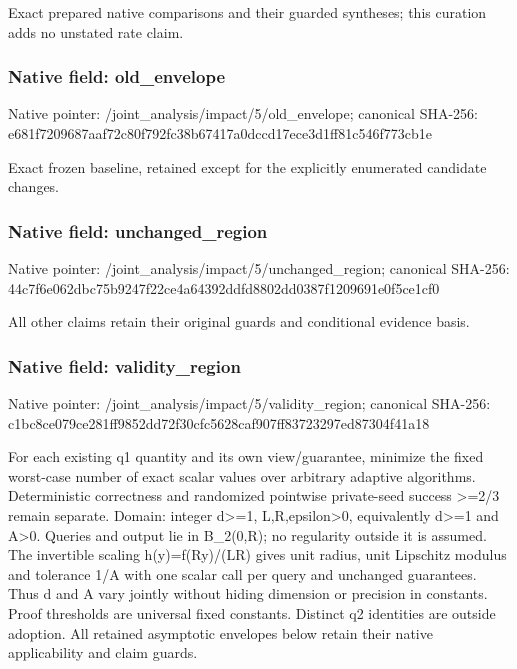 \documentclass[10pt,a4paper]{article}
\begin{document}
\begingroup\raggedright\sloppy Exact prepared native comparisons and their guarded syntheses;\allowbreak{} this curation adds no unstated rate claim.\par\endgroup

\subsubsection{Native field: old\_\allowbreak{}envelope}
Native pointer: /joint\_\allowbreak{}analysis/impact/5/old\_\allowbreak{}envelope; canonical SHA-256: e681f7209687aaf72c80f792fc38b67417a0dccd17ece3d1ff81c546f773cb1e

\begingroup\raggedright\sloppy Exact frozen baseline,\allowbreak{} retained except for the explicitly enumerated candidate changes.\par\endgroup

\subsubsection{Native field: unchanged\_\allowbreak{}region}
Native pointer: /joint\_\allowbreak{}analysis/impact/5/unchanged\_\allowbreak{}region; canonical SHA-256: 44c7f6e062dbc75b9247f22ce4a64392ddfd8802dd0387f1209691e0f5ce1cf0

\begingroup\raggedright\sloppy All other claims retain their original guards and conditional evidence basis.\par\endgroup

\subsubsection{Native field: validity\_\allowbreak{}region}
Native pointer: /joint\_\allowbreak{}analysis/impact/5/validity\_\allowbreak{}region; canonical SHA-256: c1bc8ce079ce281ff9852dd72f30cfc5628caf907ff83723297ed87304f41a18

\begingroup\raggedright\sloppy For each existing q1 quantity and its own view/\allowbreak{}guarantee,\allowbreak{} minimize the fixed worst-case number of exact scalar values over arbitrary adaptive algorithms. Deterministic correctness and randomized pointwise private-seed success >=\allowbreak{}2/\allowbreak{}3 remain separate. Domain:\allowbreak{} integer d>=\allowbreak{}1,\allowbreak{} L,\allowbreak{}R,\allowbreak{}epsilon>0,\allowbreak{} equivalently d>=\allowbreak{}1 and A>0. Queries and output lie in B\_\allowbreak{}2(0,\allowbreak{}R);\allowbreak{} no regularity outside it is assumed. The invertible scaling h(y)=\allowbreak{}f(Ry)/\allowbreak{}(LR) gives unit radius,\allowbreak{} unit Lipschitz modulus and tolerance 1/\allowbreak{}A with one scalar call per query and unchanged guarantees. Thus d and A vary jointly without hiding dimension or precision in constants. Proof thresholds are universal fixed constants. Distinct q2 identities are outside adoption. All retained asymptotic envelopes below retain their native applicability and claim guards.\par\endgroup
\end{document}
